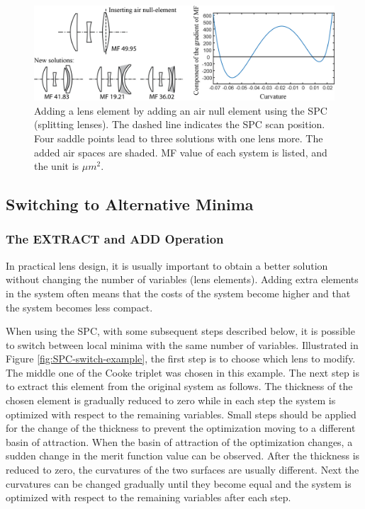 \begin{figure}[h!]
    \centering
    \includegraphics[scale=0.68]{chapter-2/figures/spc_add_air.png}
    \caption{Adding a lens element by adding an air null element using the SPC (splitting lenses). The dashed line indicates the SPC scan position. Four saddle points lead to three solutions with one lens more. The added air spaces are shaded. MF value of each system is listed, and the unit is $\mu m^2$. }
    \label{fig:SPC-air null element}
\end{figure}

\label{cp2-switching}
\subsection{Switching to Alternative Minima}

\subsubsection{The EXTRACT and ADD Operation}
In practical lens design, it is usually important to obtain a better solution without changing the number of variables (lens elements). Adding extra elements in the system often means that the costs of the system become higher and that the system becomes less compact. 

When using the SPC, with some subsequent steps described below, it is possible to switch between local minima with the same number of variables. Illustrated in Figure \ref{fig:SPC-switch-example}, the first step is to choose which lens to modify. The middle one of the Cooke triplet was chosen in this example. The next step is to extract this element from the original system as follows. The thickness of the chosen element is gradually reduced to zero while in each step the system is optimized with respect to the remaining variables. Small steps should be applied for the change of the thickness to prevent the optimization moving to a different basin of attraction. When the basin of attraction of the optimization changes, a sudden change in the merit function value can be observed. After the thickness is reduced to zero, the curvatures of the two surfaces are usually different. Next the curvatures can be changed gradually until they become equal and the system is optimized with respect to the remaining variables after each step. 

